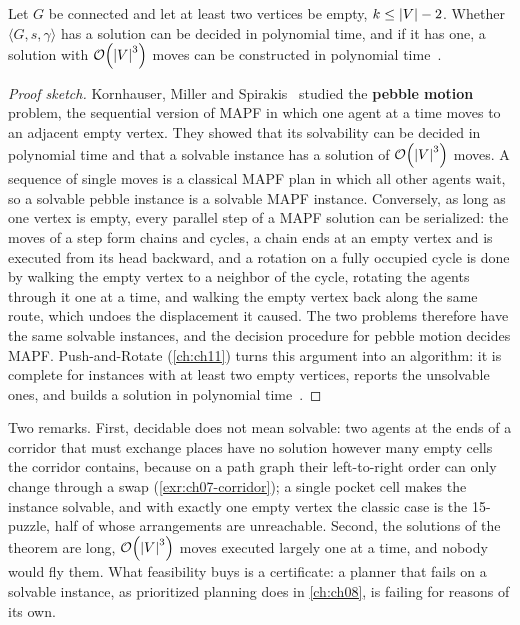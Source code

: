 \begin{theorem}
\label{thm:ch07-feasible}
Let $G$ be connected and let at least two vertices be empty,
$k \le \left\lvert V \right\rvert - 2$. Whether $\langle G, s, \gamma\rangle$ has a solution can be
decided in polynomial time, and if it has one, a solution with
$\mathcal{O}\!\left(\left\lvert V \right\rvert^3\right)$ moves can be constructed in polynomial
time~\cite{kornhauser1984pebble,dewilde2014push}.
\end{theorem}
\begin{proof}[Proof sketch]
Kornhauser, Miller and Spirakis~\cite{kornhauser1984pebble} studied the
\textbf{pebble motion} problem, the sequential version
of MAPF in which one agent at a time moves to an adjacent empty vertex. They
showed that its solvability can be decided in polynomial time and that a
solvable instance has a solution of $\mathcal{O}\!\left(\left\lvert V \right\rvert^3\right)$ moves. A sequence of
single moves is a classical MAPF plan in which all other agents wait, so a
solvable pebble instance is a solvable MAPF instance. Conversely, as long as
one vertex is empty, every parallel step of a MAPF solution can be
serialized: the moves of a step form chains and cycles, a chain ends at an
empty vertex and is executed from its head backward, and a rotation on a
fully occupied cycle is done by walking the empty vertex to a neighbor of
the cycle, rotating the agents through it one at a time, and walking the
empty vertex back along the same route, which undoes the displacement it
caused. The two problems therefore have the same solvable instances, and the
decision procedure for pebble motion decides MAPF. Push-and-Rotate (\cref{ch:ch11}) turns this argument
into an algorithm: it is complete for instances with at least two empty
vertices, reports the unsolvable ones, and builds a solution in polynomial
time~\cite{dewilde2014push}.
\end{proof}

Two remarks. First, decidable does not mean solvable: two agents at the ends
of a corridor that must exchange places have no solution however many empty
cells the corridor contains, because on a path graph their left-to-right
order can only change through a swap (\cref{exr:ch07-corridor}); a single
pocket cell makes the instance solvable, and with exactly one empty vertex
the classic case is the 15-puzzle, half of whose
arrangements are unreachable. Second, the solutions of the theorem are long,
$\mathcal{O}\!\left(\left\lvert V \right\rvert^3\right)$ moves executed largely one at a time, and nobody would fly
them. What feasibility buys is a certificate: a planner that fails on a
solvable instance, as prioritized planning does in \cref{ch:ch08}, is failing
for reasons of its own.

